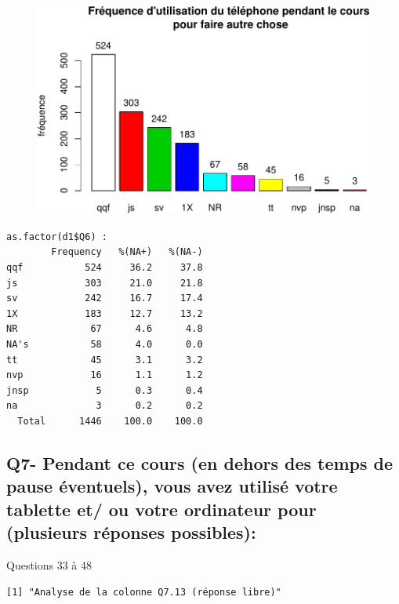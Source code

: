 \documentclass[]{article}
\begin{document}
\begin{figure}[htbp]
\centering
\includegraphics{qs_etudiants_files/figure-latex/utilisation2-1.pdf}
\end{figure}

\begin{verbatim}
as.factor(d1$Q6) : 
        Frequency   %(NA+)   %(NA-)
qqf           524     36.2     37.8
js            303     21.0     21.8
sv            242     16.7     17.4
1X            183     12.7     13.2
NR             67      4.6      4.8
NA's           58      4.0      0.0
tt             45      3.1      3.2
nvp            16      1.1      1.2
jnsp            5      0.3      0.4
na              3      0.2      0.2
  Total      1446    100.0    100.0
\end{verbatim}

\subsection{Q7- Pendant ce cours (en dehors des temps de pause
éventuels), vous avez utilisé votre tablette et/ ou votre ordinateur
pour (plusieurs réponses
possibles):}\label{q7--pendant-ce-cours-en-dehors-des-temps-de-pause-eventuels-vous-avez-utilise-votre-tablette-et-ou-votre-ordinateur-pour-plusieurs-reponses-possibles}

Questions 33 à 48

\begin{verbatim}
[1] "Analyse de la colonne Q7.13 (réponse libre)"
\end{verbatim}
\end{document}
